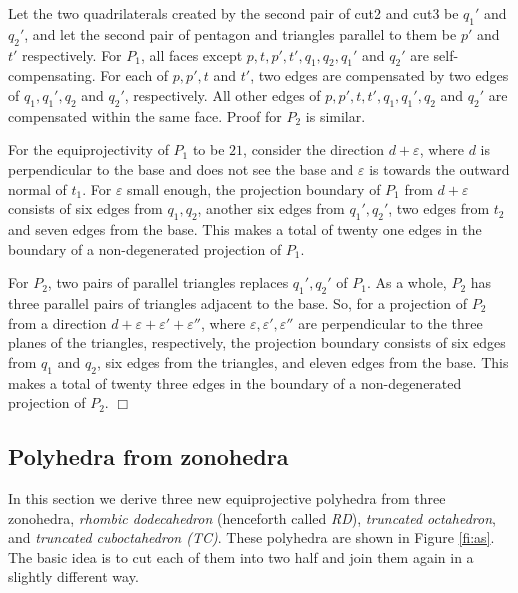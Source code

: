 \documentclass{article}
\newenvironment{proof}
{{\noindent\bf Proof}}{$\Box$}
\begin{document}
\begin{proof}
Let the two quadrilaterals created by the second pair of cut2 and cut3 be $q_1'$ and $q_2'$,
and let the second pair of pentagon and triangles parallel to them be $p'$ and $t'$ respectively.
For $P_1$, all faces except $p,t,p',t',q_1,q_2,q_1'$ and $q_2'$ are self-compensating.
For each of $p,p',t$ and $t'$, two edges are compensated by two edges of 
$q_1,q_1',q_2$ and $q_2'$, respectively.
All other edges of $p,p',t,t',q_1,q_1',q_2$ and $q_2'$ are compensated within the same face.
Proof for $P_2$ is similar.

For the equiprojectivity of $P_1$ to be $21$, consider the direction $d+\varepsilon$,
where $d$ is perpendicular to the base and does not see the base
and $\varepsilon$ is towards the outward normal of $t_1$.
For $\varepsilon$ small enough, the projection boundary of $P_1$ from 
$d+\varepsilon$ consists of six edges from $q_1,q_2$, another six edges from $q_1',q_2'$,
two edges from $t_2$ and seven edges from the base.
This makes a total of twenty one edges in the boundary of a non-degenerated projection of $P_1$.

For $P_2$, two pairs of parallel triangles replaces $q_1',q_2'$ of $P_1$.
As a whole, $P_2$ has three parallel pairs of triangles adjacent to the base.
So, for a projection of $P_2$ from a direction $d+\varepsilon+\varepsilon'+\varepsilon''$,
where $\varepsilon,\varepsilon',\varepsilon''$ are perpendicular to the
three planes of the triangles, respectively, 
the projection boundary consists of six edges from $q_1$ and $q_2$, 
six edges from the triangles, and eleven edges from the base.
This makes a total of twenty three edges in the boundary of a non-degenerated projection of $P_2$.
\end{proof}


\subsection{Polyhedra from zonohedra}

In this section we derive three new equiprojective polyhedra from
three zonohedra, \emph{rhombic dodecahedron} (henceforth called \emph{RD}),
\emph{truncated octahedron}, and \emph{truncated cuboctahedron (TC)}.
These polyhedra are shown in Figure \ref{fi:as}.
The basic idea is to cut each of them into two half and join them again in a slightly different way.
\end{document}
